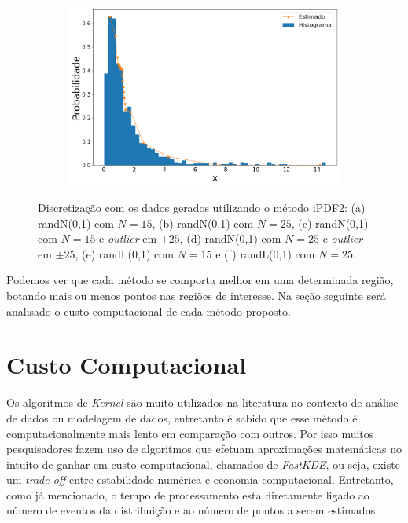 \begin{figure}[H]
\begin{subfigure}[b]{0.45\textwidth}
		\includegraphics[width=\linewidth]{./figuras/iPDF2_lognormal_25_1_1000_0}
		\caption{}
		\label{fig:ipdf2_lognorm25_data}
	\end{subfigure}
	\caption{Discretização com os dados gerados utilizando o método \ac{iPDF2}: (a) randN(0,1) com $N = 15$, (b) randN(0,1) com $N = 25$, (c) randN(0,1) com $N = 15$ e \textit{outlier} em $\pm 25$, (d) randN(0,1) com $N = 25$ e \textit{outlier} em $\pm 25$, (e) randL(0,1) com $ N = 15 $ e (f) randL(0,1) com $ N = 25 $.}
	\label{fig:ipdf2_data}
\end{figure}


Podemos ver que cada método se comporta melhor em uma determinada região, botando mais ou menos pontos nas regiões de interesse. Na seção seguinte será analisado o custo computacional de cada método proposto.%

\section{Custo Computacional}

Os algoritmos de \textit{Kernel} são muito utilizados na literatura no contexto de análise de dados ou modelagem de dados, entretanto é sabido que esse método é computacionalmente mais lento em comparação com outros. Por isso muitos pesquisadores fazem uso de algoritmos que efetuam aproximações matemáticas no intuito de ganhar em custo computacional, chamados de \textit{FastKDE}, ou seja, existe um \textit{trade-off} entre estabilidade numérica e economia computacional. Entretanto, como já mencionado, o tempo de processamento esta diretamente ligado ao número de eventos da distribuição e ao número de pontos a serem estimados.

